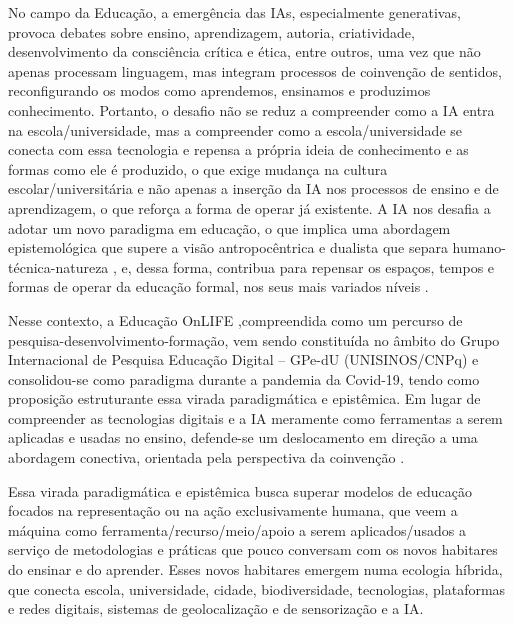 \documentclass[portuguese]{textolivre}
\begin{document}
No campo da Educação, a emergência das IAs, especialmente generativas, provoca debates sobre ensino, aprendizagem, autoria, criatividade, desenvolvimento da consciência crítica e ética, entre outros, uma vez que não apenas processam linguagem, mas integram processos de coinvenção de sentidos, reconfigurando os modos como aprendemos, ensinamos e produzimos conhecimento. Portanto, o desafio não se reduz a compreender como a IA entra na escola/universidade, mas a compreender como a escola/universidade se conecta com essa tecnologia e repensa a própria ideia de conhecimento e as formas como ele é produzido, o que exige mudança na cultura escolar/universitária e não apenas a inserção da IA nos processos de ensino e de aprendizagem, o que reforça a forma de operar já existente. A IA nos desafia a adotar um novo paradigma em educação, o que implica uma abordagem epistemológica que supere a visão antropocêntrica e dualista que separa humano-técnica-natureza \cite{serres1994contratonatural,latour2012reagregando}, e, dessa forma, contribua para repensar os espaços, tempos e formas de operar da educação formal, nos seus mais variados níveis \cite{schlemmer2023protagonismo,schlemmer2024inteligencias}.

Nesse contexto, a Educação OnLIFE \cite{schlemmer2020ecossistemas},compreendida como um percurso de pesquisa-desenvolvimento-formação, vem sendo constituída no âmbito do Grupo Internacional de Pesquisa Educação Digital – GPe-dU (UNISINOS/CNPq) e consolidou-se como paradigma durante a pandemia da Covid-19, tendo como proposição estruturante essa virada paradigmática e epistêmica. Em lugar de compreender as tecnologias digitais e a IA meramente como ferramentas a serem aplicadas e usadas no ensino, defende-se um deslocamento em direção a uma abordagem conectiva, orientada pela perspectiva da coinvenção \cite{schlemmer2024inteligencias}.

Essa virada paradigmática e epistêmica busca superar modelos de educação focados na representação ou na ação exclusivamente humana, que veem a máquina como ferramenta/recurso/meio/apoio a serem aplicados/usados a serviço de metodologias e práticas que pouco conversam com os novos habitares do ensinar e do aprender. Esses novos habitares emergem numa ecologia híbrida, que conecta escola, universidade, cidade, biodiversidade, tecnologias, plataformas e redes digitais, sistemas de geolocalização e de sensorização e a IA.
\end{document}
